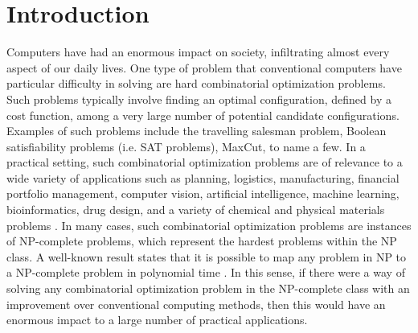 \documentclass[fleqn,10pt]{wlscirep}
\begin{document}
\section*{Introduction}
Computers have had an enormous impact on society, infiltrating almost every aspect of our daily lives.  One type of problem that conventional computers have particular difficulty in solving are hard combinatorial optimization problems. Such problems typically involve finding an optimal configuration, defined by a cost function, among a very large number of potential candidate configurations. Examples of such problems include the travelling salesman problem, Boolean satisfiability problems (i.e. SAT problems), MaxCut, to name a few.  In a practical setting, such combinatorial optimization problems are of relevance to a wide variety of applications such as planning, logistics, manufacturing, financial portfolio management, computer vision, artificial intelligence, machine learning, bioinformatics, drug design, and a variety of chemical and physical materials problems \cite{lucas2014ising, tanahashi2019application, smelyanskiy2012near,hauke2020perspectives}.  In many cases, such combinatorial optimization problems are instances of NP-complete problems, which represent the hardest problems within the NP class. A well-known result states that it is possible to map any problem in NP to a NP-complete problem in polynomial time \cite{karp1972reducibility,mezard1987spin}. 
In this sense, if there were a way of solving any combinatorial optimization problem in the NP-complete class with an improvement over conventional computing methods,
then this would have an enormous impact to a large number of practical applications. 
\end{document}
